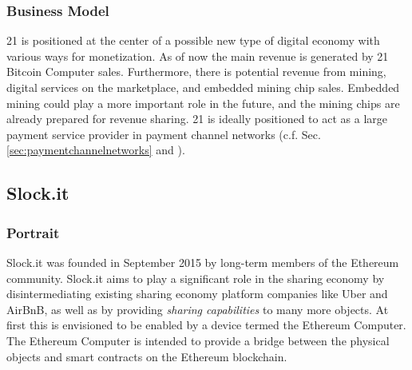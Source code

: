





\subsubsection{Business Model}

21 is positioned at the center of a possible new type of digital economy with various ways for monetization. As of now the main revenue is generated by 21 Bitcoin Computer sales. Furthermore, there is potential revenue from mining, digital services on the marketplace, and embedded mining chip sales. Embedded mining could play a more important role in the future, and the mining chips are already prepared for revenue sharing. 21 is ideally positioned to act as a large payment service provider in payment channel networks (c.f. Sec. \ref{sec:paymentchannelnetworks} and \cite{decker2015Duplex}).


\subsection{Slock.it}

\subsubsection{Portrait}
Slock.it was founded in September 2015 by long-term members of the Ethereum community. Slock.it aims to play a significant role in the sharing economy by disintermediating existing sharing economy platform companies like Uber and AirBnB, as well as by providing \emph{sharing capabilities} to many more objects. At first this is envisioned to be enabled by a device termed the Ethereum Computer. The Ethereum Computer is intended to provide a bridge between the physical objects and smart contracts on the Ethereum blockchain.


